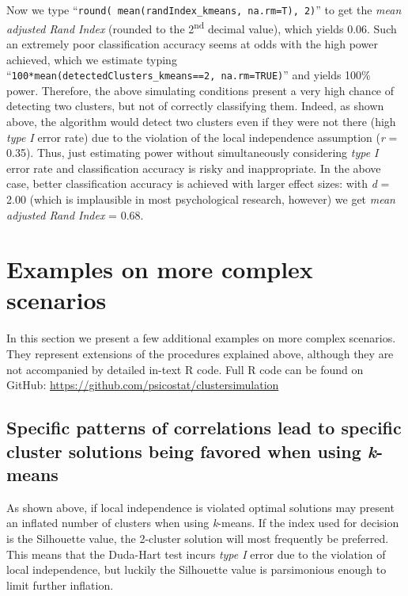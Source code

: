 \documentclass[
  man,floatsintext]{apa6}
\begin{document}
Now we type ``\texttt{round(\ mean(randIndex\_kmeans,\ na.rm=T),\ 2)}'' to get the \emph{mean adjusted Rand Index} (rounded to the 2\textsuperscript{nd} decimal value), which yields 0.06. Such an extremely poor classification accuracy seems at odds with the high power achieved, which we estimate typing ``\texttt{100*mean(detectedClusters\_kmeans==2,\ na.rm=TRUE)}'' and yields 100\% power. Therefore, the above simulating conditions present a very high chance of detecting two clusters, but not of correctly classifying them. Indeed, as shown above, the algorithm would detect two clusters even if they were not there (high \emph{type I} error rate) due to the violation of the local independence assumption (\emph{r} = 0.35). Thus, just estimating power without simultaneously considering \emph{type I} error rate and classification accuracy is risky and inappropriate. In the above case, better classification accuracy is achieved with larger effect sizes: with \emph{d} = 2.00 (which is implausible in most psychological research, however) we get \emph{mean adjusted Rand Index} = 0.68.

\hypertarget{examples-on-more-complex-scenarios}{%
\section{Examples on more complex scenarios}\label{examples-on-more-complex-scenarios}}

In this section we present a few additional examples on more complex scenarios. They represent extensions of the procedures explained above, although they are not accompanied by detailed in-text R code. Full R code can be found on GitHub: \url{https://github.com/psicostat/clustersimulation}

\hypertarget{specific-patterns-of-correlations-lead-to-specific-cluster-solutions-being-favored-when-using-k-means}{%
\subsection{\texorpdfstring{Specific patterns of correlations lead to specific cluster solutions being favored when using \emph{k}-means}{Specific patterns of correlations lead to specific cluster solutions being favored when using k-means}}\label{specific-patterns-of-correlations-lead-to-specific-cluster-solutions-being-favored-when-using-k-means}}

As shown above, if local independence is violated optimal solutions may present an inflated number of clusters when using \emph{k}-means. If the index used for decision is the Silhouette value, the 2-cluster solution will most frequently be preferred. This means that the Duda-Hart test incurs \emph{type I} error due to the violation of local independence, but luckily the Silhouette value is parsimonious enough to limit further inflation.
\end{document}
